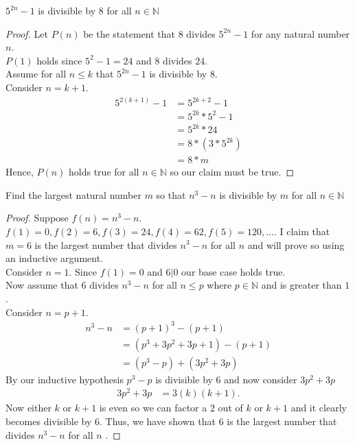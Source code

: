 \documentclass[12pt]{article}
\newcommand{\N}{\mathbb{N}}
\newenvironment{claim}[2][Claim]{\begin{trivlist}
		\item[\hskip \labelsep {\bfseries #1}\hskip \labelsep {\bfseries #2}]}{\end{trivlist}}
\begin{document}
	\begin{claim}{1.2.7}
		$5^{2n} - 1$ is divisible by $8$ for all $n \in \N$
	\end{claim}
	\begin{proof}
		Let $P(n)$ be the statement that 8 divides $5^{2n} - 1$ for any natural number $n$.\\
		$P(1)$ holds since $5^{2} -  1 = 24$ and $8$ divides $24$.
		\\Assume for all $n \leq k$ that $5^{2n} - 1$ is divisible by $8$.
		\\Consider $n = k + 1$.
		\begin{align*}
			5 ^ {2(k + 1)} - 1 & =  5 ^ {2k + 2} - 1 \\
			& = 5 ^ {2k} * 5 ^ {2} - 1\\ 
			& = 5 ^ {2k} * 24\\
			& = 8 * (3 * 5 ^ {2k})\\
			& = 8 * m
		\end{align*}
		Hence, $P(n)$ holds true for all $n \in \N$ so our claim must be true.
	\end{proof}

	\begin{claim}{1.2.17}
		Find the largest natural number $m$ so that $n^3 - n$ is divisible by $m$ for all $n \in \N$ 
	\end{claim}
	\begin{proof}
		Suppose $f(n) = n^3 - n$. $f(1) = 0, f(2) = 6, f(3) = 24, f(4) = 62, f(5) = 120, ...$. I claim that $m = 6$ is the largest number that divides $n^3 - n$ for all $n$ and will prove so using an inductive argument.\\
		Consider $n=1$. Since $f(1) = 0$ and $6 | 0$ our base case holds true.\\
		Now assume that $6$ divides $n^3 - n$ for all $n \leq p$ where $p \in \mathbb{N}$ and is greater than $1$.\\
		Consider $n = p + 1$.
		\begin{align*}
			n^3 - n & = (p + 1)^3 - (p + 1)\\
			& = (p^3 + 3p^2 + 3p + 1) - (p+1)\\
			& = (p^3 - p) + (3p^2 + 3p) 
		\end{align*}
	By our inductive hypothesis $p^3 - p$ is divisible by $6$ and now consider $3p^2 + 3p$\\
	\begin{align*}
		3p^2 + 3p & = 3 (k) (k+1).
	\end{align*}
	Now either $k$ or $k + 1$  is even so we can factor a $2$ out of $k$ or $k+1$ and it clearly becomes divisible by $6$. Thus, we have shown that $6$ is the largest number that divides $n^3 - n$ for all $n$ .
	\end{proof}
	
\end{document}
